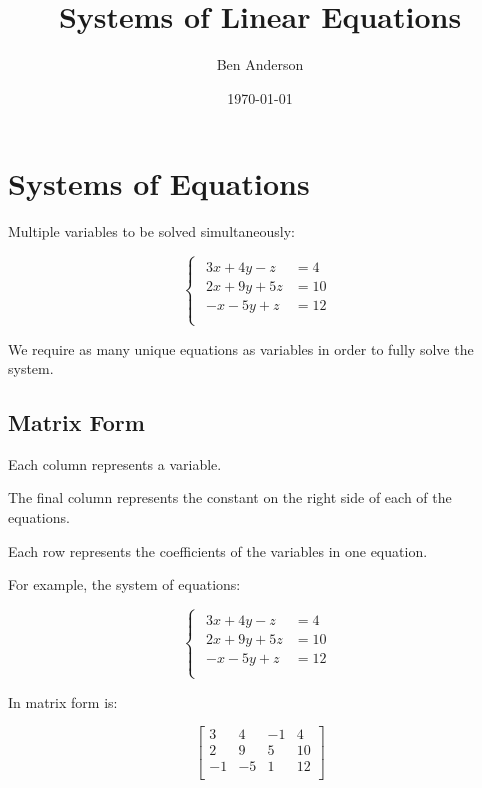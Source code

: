 \documentclass[a4paper,11pt]{article}
\begin{document}
\title{Systems of Linear Equations}
\author{Ben Anderson}
\date{\today}
\maketitle
\pagebreak

\tableofcontents
\pagebreak


\section{Systems of Equations}

Multiple variables to be solved simultaneously:

$$
\begin{cases}
\begin{aligned}
3x + 4y - z & = 4 \\
2x + 9y + 5z & = 10 \\
-x - 5y + z & = 12 \\
\end{aligned}
\end{cases}
$$

We require as many unique equations as variables in order to fully solve the
system.


\subsection{Matrix Form}

Each column represents a variable.

The final column represents the constant on the right side of each of the
equations.

Each row represents the coefficients of the variables in one equation.

For example, the system of equations:

$$
\begin{cases}
\begin{aligned}
 3x + 4y - z & = 4  \\
2x + 9y + 5z & = 10 \\
 -x - 5y + z & = 12 \\
\end{aligned}
\end{cases}
$$

In matrix form is:

$$
\begin{bmatrix}
 3 &  4 & -1 & 4  \\
 2 &  9 &  5 & 10 \\
-1 & -5 &  1 & 12 \\
\end{bmatrix}
$$
\end{document}
